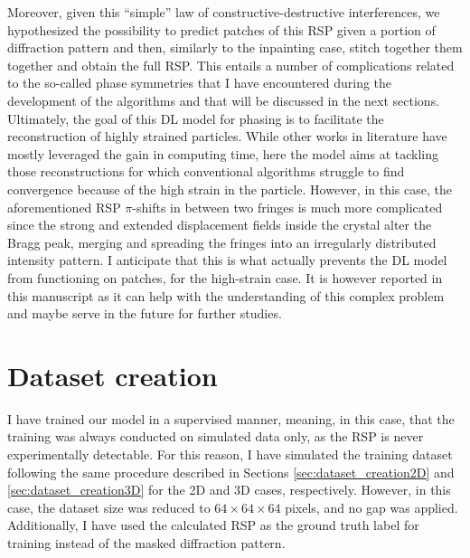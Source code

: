 Moreover, given this ``simple'' law of constructive-destructive interferences, we hypothesized the possibility to predict patches 
of this RSP given a portion of diffraction pattern and then, similarly to the inpainting case, stitch together them together
and obtain the full RSP. This entails a number of complications related to the so-called phase symmetries that I have encountered
during the development of the algorithms and that will be discussed in the next sections. \\
Ultimately, the goal of this DL model for phasing is to facilitate the reconstruction of highly strained particles. While 
other works in literature have mostly leveraged the gain in computing time, here the model aims at tackling those reconstructions for which 
conventional algorithms struggle to find convergence because of the high strain in the particle.   
However, in this case, the aforementioned RSP $\pi$-shifts in between two fringes is much more complicated since the 
strong and extended displacement fields inside the crystal alter the Bragg peak, merging and spreading the fringes 
into an irregularly distributed intensity pattern. I anticipate that this is what actually prevents the DL model 
from functioning on patches, for the high-strain case. It is however reported in this manuscript as it can help with the 
understanding of this complex problem and maybe serve in the future for further studies. 
\section{Dataset creation} 

I have trained our model in a supervised manner, meaning, in this case, that the training was always conducted on simulated data 
only, as the RSP is never experimentally detectable. 
For this reason, I have simulated the training dataset following the same procedure described in Sections 
\ref{sec:dataset_creation2D} and \ref{sec:dataset_creation3D} for the 2D and 3D cases, respectively. However, in this
case, the dataset size was reduced to $64\times64\times64$ pixels, and no gap was applied. Additionally, I have used the 
calculated RSP as the ground truth label for training instead of the masked diffraction pattern.\\

